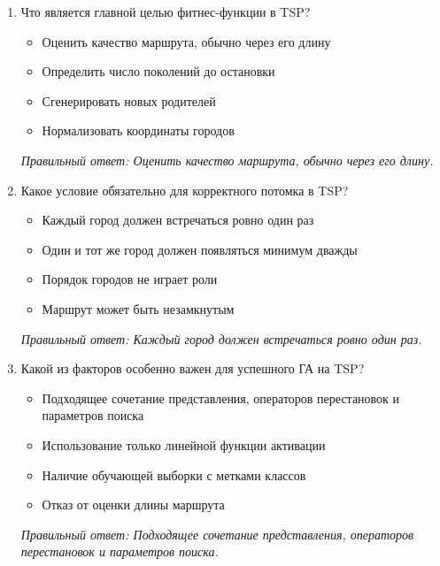 \begin{enumerate}[label=\textbf{\arabic*.}, leftmargin=0pt, itemsep=1.2em]
\item Что является главной целью фитнес-функции в TSP?
\begin{itemize}[label=$\square$, leftmargin=1.5cm, itemsep=0.2em, topsep=0.3em]
\item Оценить качество маршрута, обычно через его длину
\item Определить число поколений до остановки
\item Сгенерировать новых родителей
\item Нормализовать координаты городов
\end{itemize}
{\small\textit{Правильный ответ: Оценить качество маршрута, обычно через его длину.}}

\item Какое условие обязательно для корректного потомка в TSP?
\begin{itemize}[label=$\square$, leftmargin=1.5cm, itemsep=0.2em, topsep=0.3em]
\item Каждый город должен встречаться ровно один раз
\item Один и тот же город должен появляться минимум дважды
\item Порядок городов не играет роли
\item Маршрут может быть незамкнутым
\end{itemize}
{\small\textit{Правильный ответ: Каждый город должен встречаться ровно один раз.}}

\item Какой из факторов особенно важен для успешного ГА на TSP?
\begin{itemize}[label=$\square$, leftmargin=1.5cm, itemsep=0.2em, topsep=0.3em]
\item Подходящее сочетание представления, операторов перестановок и параметров поиска
\item Использование только линейной функции активации
\item Наличие обучающей выборки с метками классов
\item Отказ от оценки длины маршрута
\end{itemize}
{\small\textit{Правильный ответ: Подходящее сочетание представления, операторов перестановок и параметров поиска.}}

\end{enumerate}
